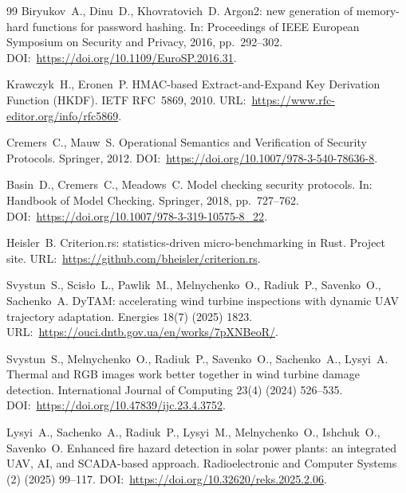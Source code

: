 \documentclass[preprint,12pt]{elsarticle}
\theoremstyle{remark}
\begin{document}
\begin{thebibliography}{99}
Biryukov~A., Dinu~D., Khovratovich~D.
Argon2: new generation of memory-hard functions for password hashing.
In: Proceedings of IEEE European Symposium on Security and Privacy, 2016, pp.~292--302.
DOI:~\url{https://doi.org/10.1109/EuroSP.2016.31}.

Krawczyk~H., Eronen~P.
HMAC-based Extract-and-Expand Key Derivation Function (HKDF).
IETF RFC~5869, 2010.
URL:~\url{https://www.rfc-editor.org/info/rfc5869}.

Cremers~C., Mauw~S.
Operational Semantics and Verification of Security Protocols.
Springer, 2012.
DOI:~\url{https://doi.org/10.1007/978-3-540-78636-8}.

Basin~D., Cremers~C., Meadows~C.
Model checking security protocols.
In: Handbook of Model Checking. Springer, 2018, pp.~727--762.
DOI:~\url{https://doi.org/10.1007/978-3-319-10575-8_22}.

Heisler~B.
Criterion.rs: statistics-driven micro-benchmarking in Rust.
Project site.
URL:~\url{https://github.com/bheisler/criterion.rs}.

Svystun~S., Scis{\l}o~L., Pawlik~M., Melnychenko~O., Radiuk~P., Savenko~O., Sachenko~A.
DyTAM: accelerating wind turbine inspections with dynamic UAV trajectory adaptation.
Energies 18(7) (2025) 1823.
URL:~\url{https://ouci.dntb.gov.ua/en/works/7pXNBeoR/}.

Svystun~S., Melnychenko~O., Radiuk~P., Savenko~O., Sachenko~A., Lysyi~A.
Thermal and RGB images work better together in wind turbine damage detection.
International Journal of Computing 23(4) (2024) 526--535.
DOI:~\url{https://doi.org/10.47839/ijc.23.4.3752}.

Lysyi~A., Sachenko~A., Radiuk~P., Lysyi~M., Melnychenko~O., Ishchuk~O., Savenko~O.
Enhanced fire hazard detection in solar power plants: an integrated UAV, AI, and SCADA-based approach.
Radioelectronic and Computer Systems (2) (2025) 99--117.
DOI:~\url{https://doi.org/10.32620/reks.2025.2.06}.

\end{thebibliography}
\end{document}
